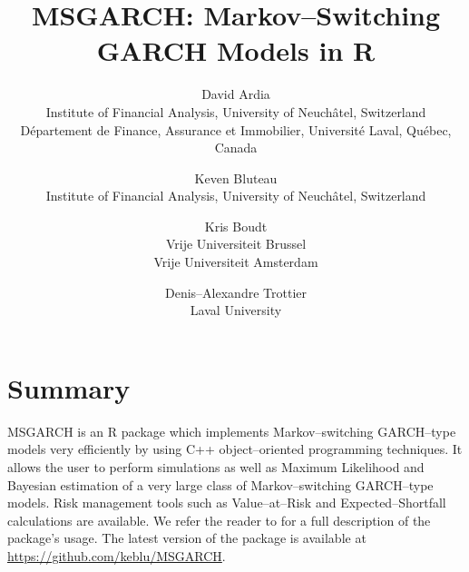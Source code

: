 \documentclass[11pt]{article}
\begin{document}
\title{MSGARCH: Markov--Switching GARCH Models in R}
\author{David Ardia\\
Institute of Financial Analysis, University of Neuch\^atel, Switzerland\\
D\'epartement de Finance, Assurance et Immobilier, Universit\'e Laval, Qu\'ebec, Canada
\and
Keven Bluteau\\
Institute of Financial Analysis, University of Neuch\^atel, Switzerland
\and
Kris Boudt\\
Vrije Universiteit Brussel\\
Vrije Universiteit Amsterdam\\
\and
Denis--Alexandre Trottier\\
Laval University
}
	
\maketitle

\section*{Summary}

MSGARCH is an R package \citep{R} which implements Markov--switching GARCH--type models very efficiently by using C++ object--oriented programming techniques. It allows the user to perform simulations as well as Maximum Likelihood and Bayesian estimation of a very large class of Markov--switching GARCH--type models. Risk management tools such as Value--at--Risk and Expected--Shortfall calculations are available. We refer the reader to \citet{ArdiaEtAl2016} for a full description of the package's usage. The latest version of the package is available at \url{https://github.com/keblu/MSGARCH}.



	
\end{document}
